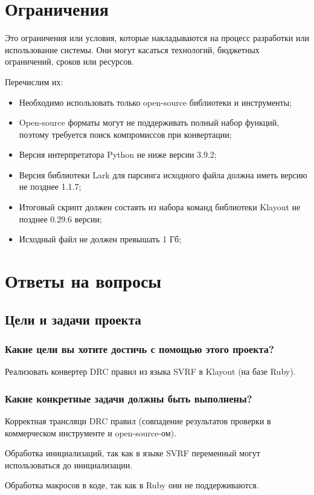 \section{Ограничения}

Это ограничения или условия,
которые накладываются на процесс разработки или использование системы.
Они могут касаться технологий, бюджетных ограничений, сроков или ресурсов.

Перечислим их:

\begin{itemize}
    \item Необходимо использовать только open-source библиотеки
		и инструменты;
    \item Open-source форматы могут не поддерживать
		полный набор функций, поэтому требуется поиск компромиссов
		при конвертации;
    \item Версия интерпретатора Python не ниже версии 3.9.2;
    \item Версия библиотеки Lark для парсинга исходного файла
		должна иметь версию не позднее 1.1.7;
    \item Итоговый скрипт должен состаять из набора команд 
		библиотеки Klayout не позднее 0.29.6 версии;
    \item Исходный файл не должен превышать 1 Гб;
\end{itemize}

\section{Ответы на вопросы}

\subsection{Цели и задачи проекта}

\subsubsection{Какие цели вы хотите достичь с помощью этого проекта?}
Реализовать конвертер DRC правил из языка SVRF в Klayout (на базе Ruby).

\subsubsection{Какие конкретные задачи должны быть выполнены?}
Корректная трансляци DRC правил (совпадение результатов проверки
в коммерческом инструменте и open-source-ом).\par
Обработка инициализаций, так как в языке SVRF переменный могут использоваться
до инициализации.\par
Обработка макросов в коде, так как в Ruby они не поддерживаются.\par

